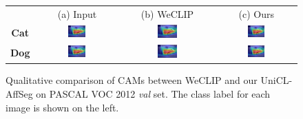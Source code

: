 \begin{figure}[ht]
  \centering
  \setlength{\tabcolsep}{2pt} %
  \renewcommand{\arraystretch}{0.9}

  \begin{tabular}{c c c c} %
    & (a) Input & (b) WeCLIP & (c) Ours \\[1mm]

    \textbf{Cat} &
    \includegraphics[width=0.23\textwidth]{figures/qualitative_analysis/test_cam/2010_005860_6.jpg} &
    \includegraphics[width=0.23\textwidth]{figures/qualitative_analysis/test_cam/2010_005860_6.jpg} &
    \includegraphics[width=0.23\textwidth]{figures/qualitative_analysis/test_cam/2010_005860_6.jpg} \\

    \textbf{Dog} &
    \includegraphics[width=0.23\textwidth]{figures/qualitative_analysis/test_cam/2010_005860_6.jpg} &
    \includegraphics[width=0.23\textwidth]{figures/qualitative_analysis/test_cam/2010_005860_6.jpg} &
    \includegraphics[width=0.23\textwidth]{figures/qualitative_analysis/test_cam/2010_005860_6.jpg} \\
  \end{tabular}

  \caption{Qualitative comparison of CAMs between WeCLIP and our UniCL-AffSeg on PASCAL VOC 2012 \textit{val} set. The class label for each image is shown on the left.}
  \label{fig:qualitative_comparison_cam_val}
\end{figure}

